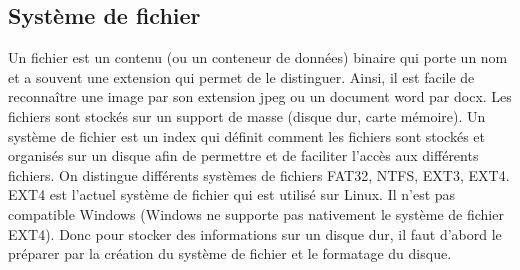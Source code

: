 \documentclass[a4paper,12pt,french]{report} %
\begin{document}
\subsection{Système de fichier}
Un fichier est un contenu (ou un conteneur de données) binaire qui porte un nom et a souvent une extension qui permet de le distinguer. Ainsi, il est facile de reconnaître une image par son extension jpeg ou un document word par docx. Les fichiers sont stockés sur un support de masse (disque dur, carte mémoire). Un système de fichier est un index qui définit comment les fichiers sont stockés et organisés sur un disque afin de permettre et de faciliter l'accès aux différents fichiers. On distingue différents systèmes de fichiers FAT32, NTFS, EXT3, EXT4. EXT4 est l'actuel système de fichier qui est utilisé sur Linux. Il n'est pas compatible Windows (Windows ne supporte pas nativement le système de fichier EXT4). Donc pour stocker des informations sur un disque dur, il faut d'abord le préparer par la création du système de fichier et le formatage du disque. %
\end{document}
